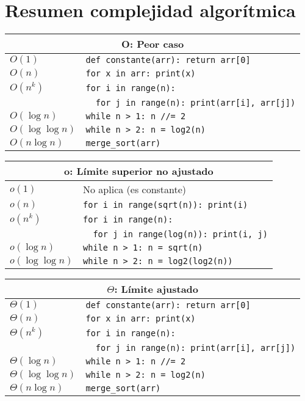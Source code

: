 \chapter{Resumen complejidad algorítmica}
\begin{table}[h]
\centering
\begin{tabular}{l l }
\multicolumn{2}{c}{O: Peor caso} \\ \hline
$O(1)$ & \texttt{def constante(arr): return arr[0]} \\ 
$O(n)$ & \texttt{for x in arr: print(x)} \\ 
$O(n^k)$ & \texttt{for i in range(n):} \\ 
 & \texttt{\ \ for j in range(n): print(arr[i], arr[j])} \\ 
$O(\log n)$ & \texttt{while n > 1: n //= 2} \\ 
$O(\log \log n)$ & \texttt{while n > 2: n = log2(n)}  \\ 
$O(n \log n)$ & \texttt{merge\_sort(arr)} \\ 
\end{tabular}
\end{table}

\begin{table}[h]
\centering
\begin{tabular}{l l }
\multicolumn{2}{c}{o: Límite superior no ajustado} \\ \hline
$o(1)$ & No aplica (es constante) \\ 
$o(n)$ & \texttt{for i in range(sqrt(n)): print(i)}\\ 
$o(n^k)$ & \texttt{for i in range(n):} \\ 
 & \texttt{\ \ for j in range(log(n)): print(i, j)} \\ 
$o(\log n)$ & \texttt{while n > 1: n = sqrt(n)}  \\ 
$o(\log \log n)$ & \texttt{while n > 2: n = log2(log2(n))}  \\ 
\end{tabular}
\end{table}

\begin{table}[h]
\centering
\begin{tabular}{l l }
 \multicolumn{2}{c}{$\Theta$: Límite ajustado} \\ \hline
$\Theta(1)$ & \texttt{def constante(arr): return arr[0]} \\ 
$\Theta(n)$ & \texttt{for x in arr: print(x)} \\ 
$\Theta(n^k)$ & \texttt{for i in range(n):} \\ 
& \texttt{\ \ for j in range(n): print(arr[i], arr[j])} \\ 
$\Theta (\log n)$ & \texttt{while n > 1: n //= 2} \\ 
$\Theta (\log \log n)$ & \texttt{while n > 2: n = log2(n)} \\ 
$\Theta(n \log n)$ & \texttt{merge\_sort(arr)} \\ 
\end{tabular}
\end{table}